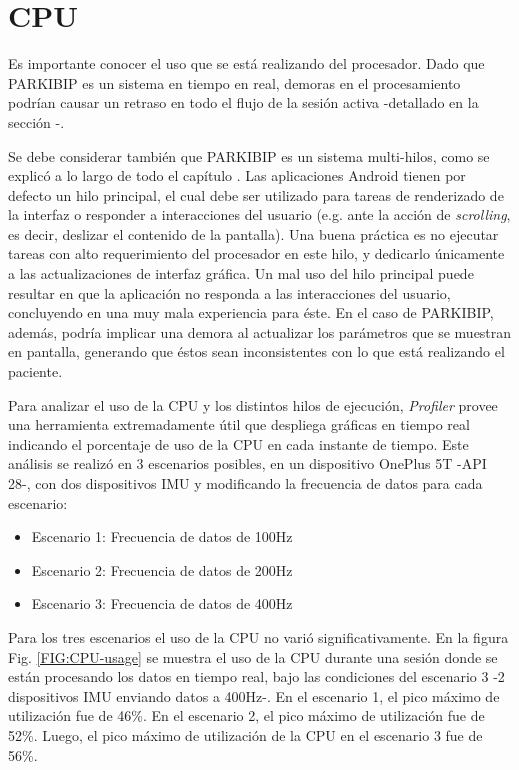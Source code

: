 \section*{CPU}

Es importante conocer el uso que se está realizando del procesador. Dado que PARKIBIP es un sistema en tiempo en real, demoras en el procesamiento podrían causar un retraso en todo el flujo de la sesión activa -detallado en la sección -.

Se debe considerar también que PARKIBIP es un sistema multi-hilos, como se explicó a lo largo de todo el capítulo . Las aplicaciones Android tienen por defecto un hilo principal, el cual debe ser utilizado para tareas de renderizado de la interfaz o responder a interacciones del usuario (e.g. ante la acción de \textit{scrolling}, es decir, deslizar el contenido de la pantalla). Una buena práctica es no ejecutar tareas con alto requerimiento del procesador en este hilo, y dedicarlo únicamente a las actualizaciones de interfaz gráfica. Un mal uso del hilo principal puede resultar en que la aplicación no responda a las interacciones del usuario, concluyendo en una muy mala experiencia para éste. En el caso de PARKIBIP, además, podría implicar una demora al actualizar los parámetros que se muestran en pantalla, generando que éstos sean inconsistentes con lo que está realizando el paciente.

Para analizar el uso de la CPU y los distintos hilos de ejecución, \textit{Profiler} provee una herramienta extremadamente útil que despliega gráficas en tiempo real indicando el porcentaje de uso de la CPU en cada instante de tiempo. Este análisis se realizó en 3 escenarios posibles, en un dispositivo OnePlus 5T -API 28-, con dos dispositivos IMU y modificando la frecuencia de datos para cada escenario: 

\begin{itemize}
    \item Escenario 1: Frecuencia de datos de 100Hz
    \item Escenario 2: Frecuencia de datos de 200Hz
    \item Escenario 3: Frecuencia de datos de 400Hz
\end{itemize}

Para los tres escenarios el uso de la CPU no varió significativamente. En la figura Fig. \ref{FIG:CPU-usage} se muestra el uso de la CPU durante una sesión donde se están procesando los datos en tiempo real, bajo las condiciones del escenario 3 -2 dispositivos IMU enviando datos a 400Hz-. En el escenario 1, el pico máximo de utilización fue de 46\%. En el escenario 2, el pico máximo de utilización fue de 52\%. Luego, el pico máximo de utilización de la CPU en el escenario 3 fue de 56\%.

